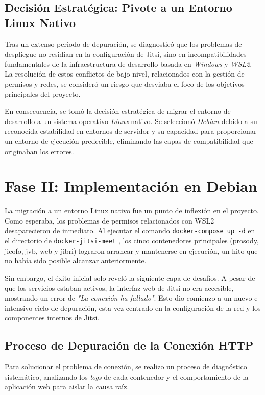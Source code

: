 \subsection{Decisión Estratégica: Pivote a un Entorno Linux Nativo}
Tras un extenso periodo de depuración, se diagnosticó que los problemas de despliegue no residían en la configuración de Jitsi, sino en incompatibilidades fundamentales de la infraestructura de desarrollo basada en \textit{Windows} y \textit{WSL2}. La resolución de estos conflictos de bajo nivel, relacionados con la gestión de permisos y redes, se consideró un riesgo que desviaba el foco de los objetivos principales del proyecto.

En consecuencia, se tomó la decisión estratégica de migrar el entorno de desarrollo a un sistema operativo \textit{Linux} nativo. Se seleccionó \textit{Debian} debido a su reconocida estabilidad en entornos de servidor y su capacidad para proporcionar un entorno de ejecución predecible, eliminando las capas de compatibilidad que originaban los errores.

\section{Fase II: Implementación en Debian}
\label{sec:desarrollo_acto2}
La migración a un entorno Linux nativo fue un punto de inflexión en el proyecto. Como esperaba, los problemas de permisos relacionados con WSL2 desaparecieron de inmediato. Al ejecutar el comando \texttt{docker-compose up -d} en el directorio de \texttt{docker-jitsi-meet} , los cinco contenedores principales (prosody, jicofo, jvb, web y jibri) lograron arrancar y mantenerse en ejecución, un hito que no había sido posible alcanzar anteriormente.

Sin embargo, el éxito inicial solo reveló la siguiente capa de desafíos. A pesar de que los servicios estaban activos, la interfaz web de Jitsi no era accesible, mostrando un error de \textit{"La conexión ha fallado"}. Esto dio comienzo a un nuevo e intensivo ciclo de depuración, esta vez centrado en la configuración de la red y los componentes internos de Jitsi.

\subsection{Proceso de Depuración de la Conexión HTTP}
Para solucionar el problema de conexión, se realizo un proceso de diagnóstico sistemático, analizando los \textit{logs} de cada contenedor y el comportamiento de la aplicación web para aislar la causa raíz.

